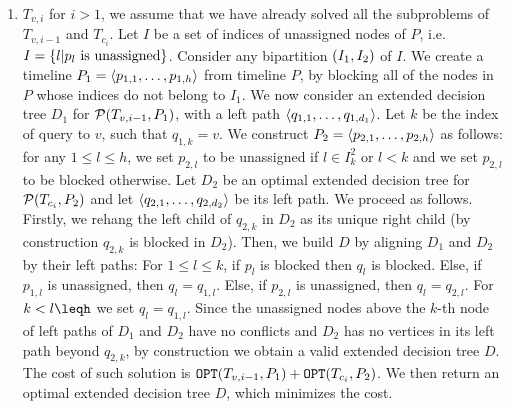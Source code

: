 \begin{enumerate}
        \item $T_{v,i}$ for $i>1$, we assume that we have already solved all the subproblems of $T_{v,i-1}$ and $T_{c_i}$. Let $I$ be a set of indices of unassigned nodes of $P$, i.e. $I=\mathopen{}\left\{ l | p_l \text{ is unassigned} \right\}$. Consider any bipartition $\mathopen{}\left( I_1, I_2 \right)$ of $I$. We create a timeline $P_1=\mathopen{}\langle p_{1,1},\dots,p_{1,h} \rangle$ from timeline $P$, by blocking all of the nodes in $P$ whose indices do not belong to $I_1$. We now consider an extended decision tree $D_1$ for $\mathcal{P}\mathopen{}\left( T_{v,i-1}, P_1 \right)$, with a left path $\mathopen{}\langle q_{1,1},\dots,q_{1,d_1} \rangle$. Let $k$ be the index of query to $v$, such that $q_{1,k}=v$. We construct $P_2=\mathopen{}\langle p_{2,1},\dots, p_{2,h} \rangle$ as follows: for any $1\leq l\leq h$, we set $p_{2,l}$ to be unassigned if $l\in I_k^2$ or $l < k$ and we set $p_{2,l}$ to be blocked otherwise. Let $D_2$ be an optimal extended decision tree for $\mathcal{P}\mathopen{}\left( T_{c_i}, P_2 \right)$ and let $\mathopen{}\langle q_{2,1},\dots,q_{2,d_2} \rangle$ be its left path. We proceed as follows. Firstly, we rehang the left child of $q_{2,k}$ in $D_2$ as its unique right child (by construction $q_{2,k}$ is blocked in $D_2$). Then, we build $D$ by aligning $D_1$ and $D_2$ by their left paths: For $1\leq l \leq k$, if $p_l$ is blocked then $q_l$ is blocked. Else, if $p_{1,l}$ is unassigned, then $q_l=q_{1,l}$. Else, if  $p_{2,l}$ is unassigned, then $q_l=q_{2,l}$. For $k<l\leqh$ we set $q_l=q_{1,l}$. Since the unassigned nodes above the $k$-th node of left paths of $D_1$ and $D_2$ have no conflicts and $D_2$ has no vertices in its left path beyond $q_{2,k}$, by construction we obtain a valid extended decision tree $D$. The cost of such solution is $\texttt{OPT}\mathopen{}\left( T_{v,i-1}, P_1 \right)+\texttt{OPT}\mathopen{}\left( T_{c_i}, P_2 \right)$. We then return an optimal extended decision tree $D$, which minimizes the cost. 
    \end{enumerate}
 








